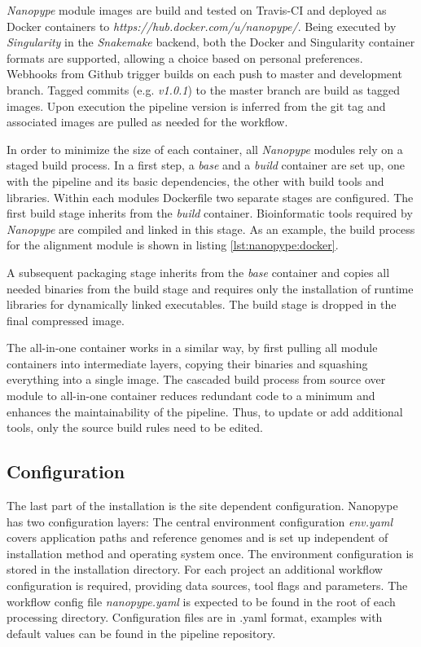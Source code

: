\textit{Nanopype} module images are build and tested on Travis-CI and deployed as Docker containers to \textit{https://hub.docker.com/u/nanopype/}. Being executed by \textit{Singularity} in the \textit{Snakemake} backend, both the Docker and Singularity container formats are supported, allowing a choice based on personal preferences.
Webhooks from Github trigger builds on each push to master and development branch. Tagged commits (e.g. \textit{v1.0.1}) to the master branch are build as tagged images. Upon execution the pipeline version is inferred from the git tag and associated images are pulled as needed for the workflow.


In order to minimize the size of each container, all \textit{Nanopype} modules rely on a staged build process. In a first step, a \textit{base} and a \textit{build} container are set up, one with the pipeline and its basic dependencies, the other with build tools and libraries. Within each modules Dockerfile two separate stages are configured. The first build stage inherits from the \textit{build} container. Bioinformatic tools required by \textit{Nanopype} are compiled and linked in this stage. As an example, the build process for the alignment module is shown in listing \ref{lst:nanopype:docker}.



A subsequent packaging stage inherits from the \textit{base} container and copies all needed binaries from the build stage and requires only the installation of runtime libraries for dynamically linked executables. The build stage is dropped in the final compressed image. 

The all-in-one container works in a similar way, by first pulling all module containers into intermediate layers, copying their binaries and squashing everything into a single image. The cascaded build process from source over module to all-in-one container reduces redundant code to a minimum and enhances the maintainability of the pipeline. Thus, to update or add additional tools, only the source build rules need to be edited.


\subsection{Configuration}

The last part of the installation is the site dependent configuration. Nanopype has two configuration layers: The central environment configuration \textit{env.yaml} covers application paths and reference genomes and is set up independent of installation method and operating system once. The environment configuration is stored in the installation directory. For each project an additional workflow configuration is required, providing data sources, tool flags and parameters. The workflow config file \textit{nanopype.yaml} is expected to be found in the root of each processing directory. Configuration files are in .yaml format, examples with default values can be found in the pipeline repository.

